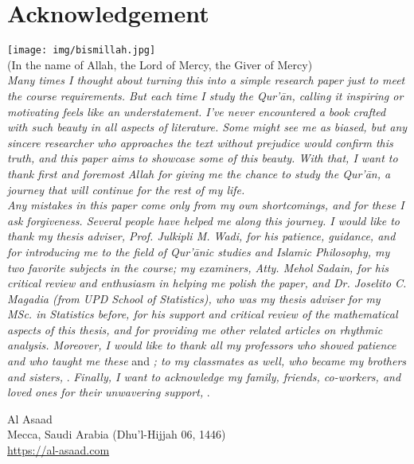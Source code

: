 \chapter*{Acknowledgement}
{\centering
\texttt{[image: img/bismillah.jpg]}\\[-.2cm]
(In the name of Allah, the Lord of Mercy, the Giver of Mercy)\\[0.6cm]
}\textit{Many times I thought about turning this into a simple research paper just to meet the course requirements. But each time I study the Qur'\=an, calling it inspiring or motivating feels like an understatement. I've never encountered a book crafted with such beauty in all aspects of literature. Some might see me as biased, but any sincere researcher who approaches the text without prejudice would confirm this truth, and this paper aims to showcase some of this beauty. With that, I want to thank first and foremost Allah \textrm{} for giving me the chance to study the Qur'\=an, a journey that will continue for the rest of my life.}\\[0.3cm]
\indent\textit{Any mistakes in this paper come only from my own shortcomings, and for these I ask forgiveness. Several people have helped me along this journey. I would like to thank my thesis adviser, Prof. Julkipli M. Wadi, for his patience, guidance, and for introducing me to the field of Qur'\=anic studies and Islamic Philosophy, my two favorite subjects in the course; my examiners, Atty. Mehol Sadain, for his critical review and enthusiasm in helping me polish the paper, and Dr. Joselito C. Magadia (from UPD School of Statistics), who was my thesis adviser for my MSc. in Statistics before, for his support and critical review of the mathematical aspects of this thesis, and for providing me other related articles on rhythmic analysis. Moreover, I would like to thank all my professors who showed patience and who taught me these}  and \textit{; to my classmates as well, who became my brothers and sisters,} . \textit{Finally, I want to acknowledge my family, friends, co-workers, and loved ones for their unwavering support,} .\\
\begin{center}
    Al Asaad\\
    Mecca, Saudi Arabia (Dhu'l-Hijjah 06, 1446)\\
    \url{https://al-asaad.com}\\[-0.5cm]
\end{center}
